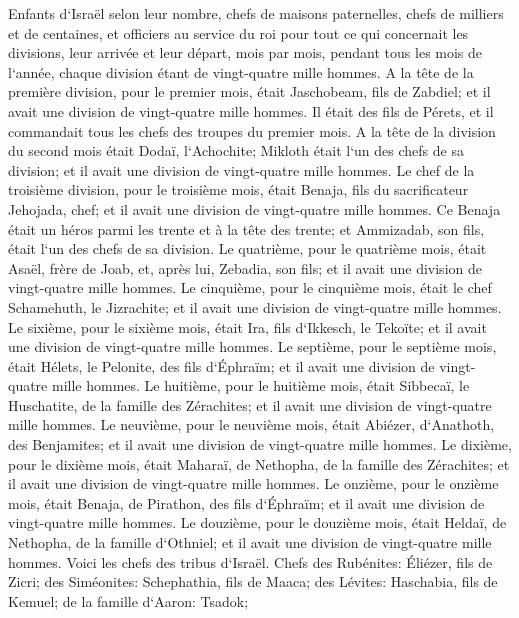 \verse Enfants d`Israël selon leur nombre, chefs de maisons paternelles, chefs de milliers et de centaines, et officiers au service du roi pour tout ce qui concernait les divisions, leur arrivée et leur départ, mois par mois, pendant tous les mois de l`année, chaque division étant de vingt-quatre mille hommes. 
\verse A la tête de la première division, pour le premier mois, était Jaschobeam, fils de Zabdiel; et il avait une division de vingt-quatre mille hommes. 
\verse Il était des fils de Pérets, et il commandait tous les chefs des troupes du premier mois. 
\verse A la tête de la division du second mois était Dodaï, l`Achochite; Mikloth était l`un des chefs de sa division; et il avait une division de vingt-quatre mille hommes. 
\verse Le chef de la troisième division, pour le troisième mois, était Benaja, fils du sacrificateur Jehojada, chef; et il avait une division de vingt-quatre mille hommes. 
\verse Ce Benaja était un héros parmi les trente et à la tête des trente; et Ammizadab, son fils, était l`un des chefs de sa division. 
\verse Le quatrième, pour le quatrième mois, était Asaël, frère de Joab, et, après lui, Zebadia, son fils; et il avait une division de vingt-quatre mille hommes. 
\verse Le cinquième, pour le cinquième mois, était le chef Schamehuth, le Jizrachite; et il avait une division de vingt-quatre mille hommes. 
\verse Le sixième, pour le sixième mois, était Ira, fils d`Ikkesch, le Tekoïte; et il avait une division de vingt-quatre mille hommes. 
\verse Le septième, pour le septième mois, était Hélets, le Pelonite, des fils d`Éphraïm; et il avait une division de vingt-quatre mille hommes. 
\verse Le huitième, pour le huitième mois, était Sibbecaï, le Huschatite, de la famille des Zérachites; et il avait une division de vingt-quatre mille hommes. 
\verse Le neuvième, pour le neuvième mois, était Abiézer, d`Anathoth, des Benjamites; et il avait une division de vingt-quatre mille hommes. 
\verse Le dixième, pour le dixième mois, était Maharaï, de Nethopha, de la famille des Zérachites; et il avait une division de vingt-quatre mille hommes. 
\verse Le onzième, pour le onzième mois, était Benaja, de Pirathon, des fils d`Éphraïm; et il avait une division de vingt-quatre mille hommes. 
\verse Le douzième, pour le douzième mois, était Heldaï, de Nethopha, de la famille d`Othniel; et il avait une division de vingt-quatre mille hommes. 
\verse Voici les chefs des tribus d`Israël. Chefs des Rubénites: Éliézer, fils de Zicri; des Siméonites: Schephathia, fils de Maaca; 
\verse des Lévites: Haschabia, fils de Kemuel; de la famille d`Aaron: Tsadok; 
